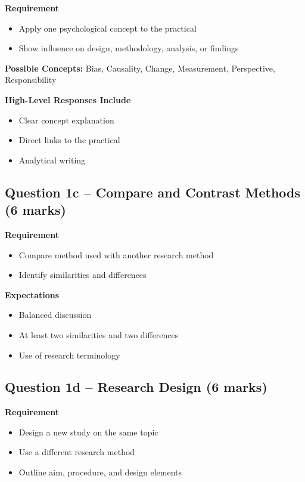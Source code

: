 \documentclass[12pt,a4paper]{article}
\begin{document}
\textbf{Requirement}
\begin{itemize}
    \item Apply one psychological concept to the practical
    \item Show influence on design, methodology, analysis, or findings
\end{itemize}

\textbf{Possible Concepts:}
Bias, Causality, Change, Measurement, Perspective, Responsibility

\textbf{High-Level Responses Include}
\begin{itemize}
    \item Clear concept explanation
    \item Direct links to the practical
    \item Analytical writing
\end{itemize}

\subsection*{Question 1c – Compare and Contrast Methods (6 marks)}

\textbf{Requirement}
\begin{itemize}
    \item Compare method used with another research method
    \item Identify similarities and differences
\end{itemize}

\textbf{Expectations}
\begin{itemize}
    \item Balanced discussion
    \item At least two similarities and two differences
    \item Use of research terminology
\end{itemize}

\subsection*{Question 1d – Research Design (6 marks)}

\textbf{Requirement}
\begin{itemize}
    \item Design a new study on the same topic
    \item Use a different research method
    \item Outline aim, procedure, and design elements
\end{itemize}
\end{document}
